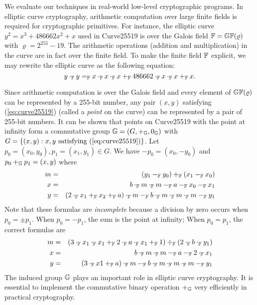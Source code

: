 
We evaluate our techniques in real-world low-level cryptographic
programs. In elliptic curve cryptography, arithmetic computation over
large finite fields is required for cryptographic primitives. For
instance, the elliptic curve $y^2 = x^3 + 486662 x^2 + x$ used in 
Curve25519 is over the Galois field $\mathbb{F} = \mathbb{GF}(\varrho)$ with
$\varrho = 2^{255} - 19$. The arithmetic operations (addition and
multiplication) in the curve are in fact over the finite field. To
make the finite field $\mathbb{F}$ explicit, we may rewrite the elliptic
curve as the following equation: 
\begin{equation}
  \label{eq:curve25519}
  y \cdot_{\mathbb{F}} y =_{\mathbb{F}} x \cdot_{\mathbb{F}} x \cdot_{\mathbb{F}} x +_{\mathbb{F}}
  486662 \cdot_{\mathbb{F}} x \cdot_{\mathbb{F}} x +_{\mathbb{F}} x.
\end{equation}

Since arithmetic computation is over the Galois field and every
element of $\mathbb{GF}(\varrho)$ can be represented by a 255-bit number,
any pair $(x, y)$ satisfying (\ref{eq:curve25519}) (called a
\emph{point} on the curve) can be represented by a pair of 255-bit
numbers. It can be shown that points on Curve25519 with the point at
infinity form a commutative group $\mathbb{G} = (G, +_{\mathbb{G}}, 0_{\mathbb{G}})$
with $G = \{ (x, y) : x, y \textmd{ satisfying } (\ref{eq:curve25519})
\}$. Let $p_0 = (x_0, y_0), p_1 = (x_1, y_1) \in G$. We have $-p_0 =
(x_0, -y_0)$ and $p_0 +_{\mathbb{G}} p_1 = (x, y)$ where
\begin{eqnarray}
  m & = & (y_1 \Fminus y_0) \Fdiv (x_1 \Fminus x_0)\\\nonumber
  x & = & b \Ftimes m \Ftimes m \Fminus a \Fminus x_0 \Fminus x_1\\ \nonumber
  y & = & %
          (2 \Ftimes x_1 \Fplus x_2 \Fplus a )\Ftimes m
          \Fminus b \Ftimes m \Ftimes m \Ftimes m\Fminus y_1
  \label{eq:curve25519-group}
\end{eqnarray}
% 
Note that these formulas are \emph{incomplete} because a division by
zero occurs when $p_0=\pm p_1$.  When $p_0=-p_1$, the sum is
the point at infinity; When $p_0= p_1$, the correct
formulas are 
\begin{eqnarray}
  \label{eq:curve25519-dbl}
  m &=& (3  \cdot_{\mathbb{F}} x_1 \cdot_{\mathbb{F}} x_1 +_{\mathbb{F}} 2\cdot_{\mathbb{F}} a\cdot_{\mathbb{F}} x_1+_{\mathbb{F}} 1) 
        \div_{\mathbb{F}} (2\cdot_{\mathbb{F}} b\cdot_{\mathbb{F}} y_1) \\ \nonumber
   x &=& b \cdot_{\mathbb{F}} m \cdot_{\mathbb{F}} m -_{\mathbb{F}} a -_{\mathbb{F}} 2 \cdot_{\mathbb{F}} x_1 \\ \nonumber
   y &=& (3 \cdot_{\mathbb{F}} x1+_{\mathbb{F}} a) \cdot_{\mathbb{F}} m -_{\mathbb{F}} b \cdot_{\mathbb{F}} m \cdot_{\mathbb{F}} m \cdot_{\mathbb{F}} m-_{\mathbb{F}} y_1
\end{eqnarray}
%
The induced group $\mathbb{G}$
plays an important role in elliptic curve cryptography. It is
essential to implement the commutative binary operation $+_{\mathbb{G}}$ very
efficiently in practical cryptography.

